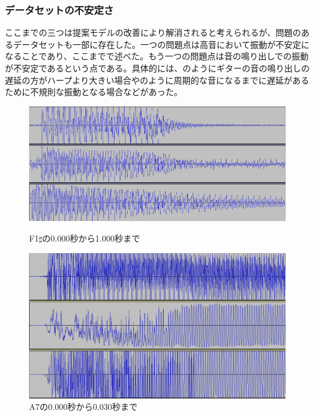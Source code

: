 \subsubsection{データセットの不安定さ}

ここまでの三つは提案モデルの改善により解消されると考えられるが、問題のあるデータセットも一部に存在した。一つの問題点は高音において振動が不安定になることであり、ここまでで述べた。もう一つの問題点は音の鳴り出しでの振動が不安定であるという点である。具体的には、のようにギターの音の鳴り出しの遅延の方がハープより大きい場合やのように周期的な音になるまでに遅延があるために不規則な振動となる場合などがあった。

\begin{figure}[b]
\centering
\begin{minipage}[b]{0.48\columnwidth}
\centering
\includegraphics[width=0.9\columnwidth]{figure/88_88/f1s.png}
\caption[F1$\sharp$の音波]{F1$\sharp$の0.000秒から1.000秒まで}
\label{fig:88_88_lag1}
\end{minipage}
\begin{minipage}[b]{0.48\columnwidth}
\centering
\includegraphics[width=0.75\columnwidth]{figure/88_88_det/a7_0_0030.png}
\caption[A7の音波]{A7の0.000秒から0.030秒まで}
\label{fig:88_88_lag2}
\end{minipage}
\end{figure}